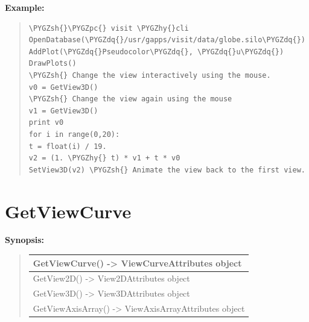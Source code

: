 \documentclass[letterpaper,10pt,english]{sphinxmanual}
\def\PYGZsh{\char`\#}
\def\PYGZpc{\char`\%}
\def\PYGZhy{\char`\-}
\def\PYGZdq{\char`\"}
\begin{document}
\begin{DUlineblock}{0em}
\item[] \textbf{Example:}
\item[] 
\end{DUlineblock}
\begin{quote}

\begin{Verbatim}[commandchars=\\\{\}]
\PYGZsh{}\PYGZpc{} visit \PYGZhy{}cli
OpenDatabase(\PYGZdq{}/usr/gapps/visit/data/globe.silo\PYGZdq{})
AddPlot(\PYGZdq{}Pseudocolor\PYGZdq{}, \PYGZdq{}u\PYGZdq{})
DrawPlots()
\PYGZsh{} Change the view interactively using the mouse.
v0 = GetView3D()
\PYGZsh{} Change the view again using the mouse
v1 = GetView3D()
print v0
for i in range(0,20):
t = float(i) / 19.
v2 = (1. \PYGZhy{} t) * v1 + t * v0
SetView3D(v2) \PYGZsh{} Animate the view back to the first view.
\end{Verbatim}
\end{quote}


\section{GetViewCurve}
\label{functions:getviewcurve}
\begin{DUlineblock}{0em}
\item[] \textbf{Synopsis:}
\end{DUlineblock}
\begin{quote}

\begin{tabulary}{\linewidth}{|L|}
\hline

GetViewCurve() -\textgreater{} ViewCurveAttributes object
\\
\hline
GetView2D() -\textgreater{} View2DAttributes object
\\
\hline
GetView3D() -\textgreater{} View3DAttributes object
\\
\hline
GetViewAxisArray() -\textgreater{} ViewAxisArrayAttributes object
\\
\hline\end{tabulary}

\end{quote}
\end{document}
